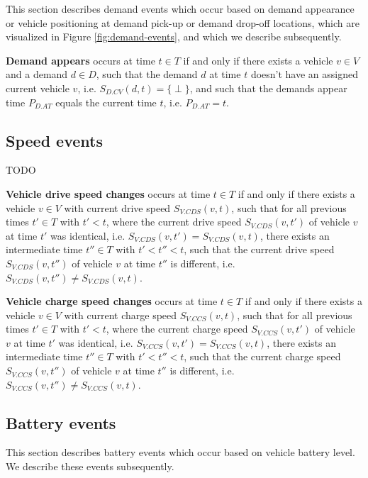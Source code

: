 \documentclass[graybox]{svmult}
\begin{document}
This section describes demand events which occur based on demand appearance or vehicle positioning at demand pick-up or demand drop-off locations, which are visualized in Figure \ref{fig:demand-events}, and which we describe subsequently.

\vspace{2mm}
\noindent \textbf{Demand appears} occurs at time $t \in T$ if and only if there exists a vehicle $v \in V$ and a demand $d \in D$, such that the demand $d$ at time $t$ doesn't have an assigned current vehicle $v$, i.e. $S_{D.CV}(d, t) = \{\perp\}$, and such that the demands appear time $P_{D.AT}$ equals the current time $t$, i.e. $P_{D.AT} = t$.

\subsection{Speed events}
\label{sec:speed-events}

TODO

\vspace{2mm}
\noindent \textbf{Vehicle drive speed changes} occurs at time $t \in T$ if and only if there exists a vehicle $v \in V$ with current drive speed $S_{V.CDS}(v, t)$, such that for all previous times $t' \in T$ with $t' < t$, where the current drive speed $S_{V.CDS}(v,t')$ of vehicle $v$ at time $t'$ was identical, i.e. $S_{V.CDS}(v,t') = S_{V.CDS}(v,t)$, there exists an intermediate time $t'' \in T$ with $t' < t'' < t$, such that the current drive speed $S_{V.CDS}(v,t'')$ of vehicle $v$ at time $t''$ is different, i.e. $S_{V.CDS}(v,t'') \neq S_{V.CDS}(v,t)$.

\vspace{2mm}
\noindent \textbf{Vehicle charge speed changes} occurs at time $t \in T$ if and only if there exists a vehicle $v \in V$ with current charge speed $S_{V.CCS}(v, t)$, such that for all previous times $t' \in T$ with $t' < t$, where the current charge speed $S_{V.CCS}(v,t')$ of vehicle $v$ at time $t'$ was identical, i.e. $S_{V.CCS}(v,t') = S_{V.CCS}(v,t)$, there exists an intermediate time $t'' \in T$ with $t' < t'' < t$, such that the current charge speed $S_{V.CCS}(v,t'')$ of vehicle $v$ at time $t''$ is different, i.e. $S_{V.CCS}(v,t'') \neq S_{V.CCS}(v,t)$.


\subsection{Battery events}
\label{sec:battery-events}

This section describes battery events which occur based on vehicle battery level. We describe these events subsequently.
\end{document}
